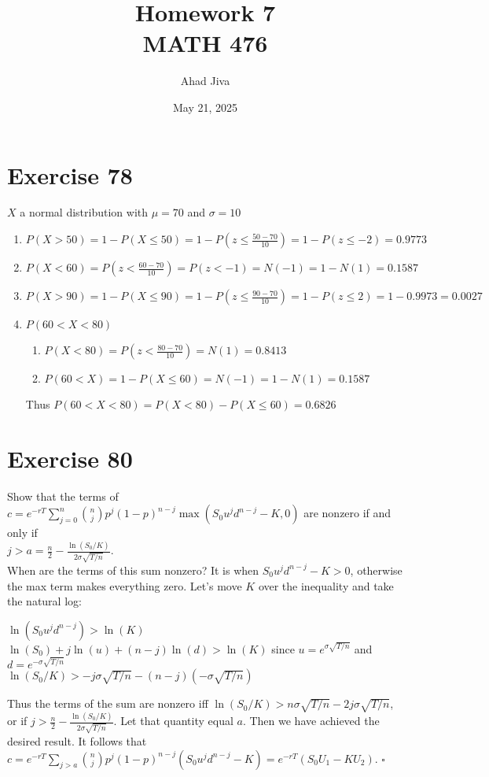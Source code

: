 \documentclass{article}
\title{Homework 7 \\ \large MATH 476}
\author{Ahad Jiva}
\date{May 21, 2025}
\begin{document}
\maketitle

\section*{Exercise 78}
\begin{flushleft}
    $X$ a normal distribution with $\mu = 70$ and $\sigma = 10$
    \begin{enumerate}
        \item $P(X>50) = 1-P(X\leq 50) = 1-P(z \leq \frac{50-70}{10}) = 1-P(z\leq -2) = 0.9773$
        \item $P(X<60) = P(z<\frac{60-70}{10}) = P(z<-1) = N(-1) = 1 - N(1) = 0.1587$
        \item $P(X>90) = 1 - P(X\leq 90) = 1-P(z\leq \frac{90-70}{10}) = 1-P(z\leq 2) = 1-0.9973 = 0.0027$
        \item $P(60<X<80)$
            \begin{enumerate}
                \item $P(X<80) = P(z < \frac{80-70}{10}) = N(1) = 0.8413$
                \item $P(60<X) = 1-P(X\leq 60) = N(-1) = 1-N(1)= 0.1587$
            \end{enumerate}
            Thus $P(60<X<80) = P(X<80) - P(X\leq60) = 0.6826$
    \end{enumerate}
\end{flushleft}

\section*{Exercise 80}
\begin{flushleft}
    Show that the terms of $c = e^{-rT} \sum_{j=0}^{n} \binom{n}{j} p^j (1-p)^{n-j} \max{(S_0u^jd^{n-j} - K, 0)}$ are nonzero if and only if \\
    $j>a = \frac{n}{2} - \frac{\ln(S_0 / K)}{2\sigma \sqrt{T/n}}$. \\
    When are the terms of this sum nonzero? It is when $S_0u^jd^{n-j} - K >0$, otherwise the max term makes everything zero. Let's move $K$ over the inequality and take the natural log: \\
    \begin{center}
        $\ln(S_0u^jd^{n-j}) > \ln(K)$ \\
        $\ln(S_0) + j\ln(u) + (n-j)\ln(d) > \ln(K)$ since $u = e^{\sigma \sqrt{T/n}}$ and $d = e^{-\sigma \sqrt{T/n}}$ \\
        $\ln(S_0 /K) > -j\sigma \sqrt{T/n} - (n-j)(- \sigma \sqrt{T/n})$
    \end{center}
    Thus the terms of the sum are nonzero iff $\ln(S_0/K) > n\sigma \sqrt{T/n} - 2j\sigma \sqrt{T/n}$, or if $j > \frac{n}{2} - \frac{\ln(S_0/K)}{2\sigma \sqrt{T/n}}$. Let that quantity equal $a$.
    Then we have achieved the desired result. It follows that $c = e^{-rT} \sum_{j>a}^{} \binom{n}{j} p^j (1-p)^{n-j} (S_0u^jd^{n-j} - K) = e^{-rT}(S_0U_1 - KU_2)$. $\square$
\end{flushleft}
\end{document}
